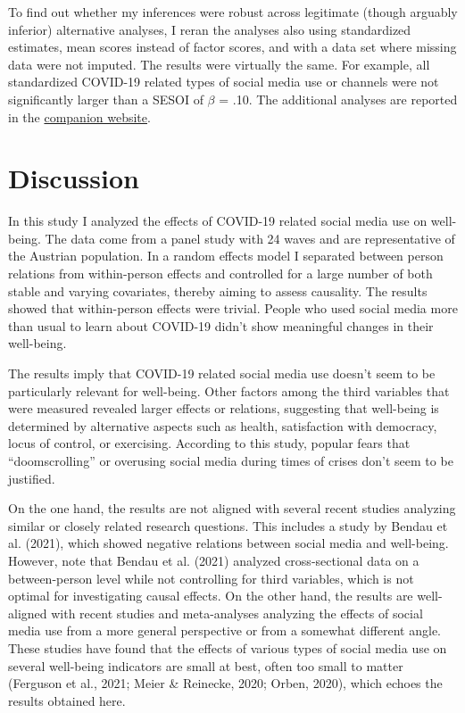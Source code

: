 \documentclass[
  english,
  man,mask,floatsintext]{apa6}
\begin{document}
To find out whether my inferences were robust across legitimate (though arguably inferior) alternative analyses, I reran the analyses also using standardized estimates, mean scores instead of factor scores, and with a data set where missing data were not imputed.
The results were virtually the same.
For example, all standardized COVID-19 related types of social media use or channels were not significantly larger than a SESOI of \(\beta\) = \textbar.10\textbar.
The additional analyses are reported in the \href{https://tdienlin.github.io/Austrian_Corona_Panel/analyses_additional.html}{companion website}.

\hypertarget{discussion}{%
\section{Discussion}\label{discussion}}

In this study I analyzed the effects of COVID-19 related social media use on well-being.
The data come from a panel study with 24 waves and are representative of the Austrian population.
In a random effects model I separated between person relations from within-person effects and controlled for a large number of both stable and varying covariates, thereby aiming to assess causality.
The results showed that within-person effects were trivial.
People who used social media more than usual to learn about COVID-19 didn't show meaningful changes in their well-being.

The results imply that COVID-19 related social media use doesn't seem to be particularly relevant for well-being.
Other factors among the third variables that were measured revealed larger effects or relations, suggesting that well-being is determined by alternative aspects such as health, satisfaction with democracy, locus of control, or exercising.
According to this study, popular fears that ``doomscrolling'' or overusing social media during times of crises don't seem to be justified.

On the one hand, the results are not aligned with several recent studies analyzing similar or closely related research questions.
This includes a study by Bendau et al. (2021), which showed negative relations between social media and well-being.
However, note that Bendau et al. (2021) analyzed cross-sectional data on a between-person level while not controlling for third variables, which is not optimal for investigating causal effects.
On the other hand, the results are well-aligned with recent studies and meta-analyses analyzing the effects of social media use from a more general perspective or from a somewhat different angle.
These studies have found that the effects of various types of social media use on several well-being indicators are small at best, often too small to matter (Ferguson et al., 2021; Meier \& Reinecke, 2020; Orben, 2020), which echoes the results obtained here.
\end{document}
